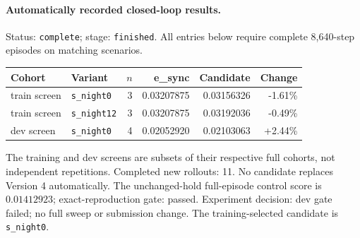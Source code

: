 \paragraph{Automatically recorded closed-loop results.}
Status: \texttt{complete}; stage: \texttt{finished}.
All entries below require complete 8,640-step episodes on matching scenarios.
\begin{center}\small
\begin{tabular}{llrrrr}\toprule
Cohort & Variant & $n$ & e\_sync & Candidate & Change \\\midrule
train screen & \texttt{s\_night0} & 3 & 0.03207875 & 0.03156326 & -1.61\% \\
train screen & \texttt{s\_night12} & 3 & 0.03207875 & 0.03192036 & -0.49\% \\
dev screen & \texttt{s\_night0} & 4 & 0.02052920 & 0.02103063 & +2.44\% \\
\bottomrule\end{tabular}\end{center}
The training and dev screens are subsets of their respective full cohorts, not independent repetitions.
Completed new rollouts: 11. No candidate replaces Version 4 automatically.
The unchanged-hold full-episode control score is $0.01412923$; exact-reproduction gate: passed.
Experiment decision: dev gate failed; no full sweep or submission change.
The training-selected candidate is \texttt{s\_night0}.
